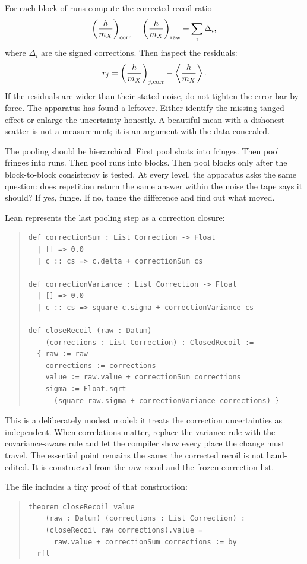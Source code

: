 For each block of runs compute the corrected recoil ratio
\[
  \left(\frac{h}{m_X}\right)_{\rm corr}
  =
  \left(\frac{h}{m_X}\right)_{\rm raw}
  + \sum_i \Delta_i,
\]
where \(\Delta_i\) are the signed corrections. Then inspect the residuals:
\[
  r_j =
  \left(\frac{h}{m_X}\right)_{j,{\rm corr}}
  -
  \left\langle\frac{h}{m_X}\right\rangle .
\]
If the residuals are wider than their stated noise, do not tighten the error bar by force. The apparatus has
found a leftover. Either identify the missing tanged effect or enlarge the uncertainty honestly. A beautiful mean
with a dishonest scatter is not a measurement; it is an argument with the data concealed.

The pooling should be hierarchical. First pool shots into fringes. Then pool fringes into runs. Then pool runs
into blocks. Then pool blocks only after the block-to-block consistency is tested. At every level, the apparatus
asks the same question: does repetition return the same answer within the noise the tape says it should? If yes,
funge. If no, tange the difference and find out what moved.

Lean represents the last pooling step as a correction closure:

\begin{quote}\small
\begin{verbatim}
def correctionSum : List Correction -> Float
  | [] => 0.0
  | c :: cs => c.delta + correctionSum cs

def correctionVariance : List Correction -> Float
  | [] => 0.0
  | c :: cs => square c.sigma + correctionVariance cs

def closeRecoil (raw : Datum)
    (corrections : List Correction) : ClosedRecoil :=
  { raw := raw
    corrections := corrections
    value := raw.value + correctionSum corrections
    sigma := Float.sqrt
      (square raw.sigma + correctionVariance corrections) }
\end{verbatim}
\end{quote}

This is a deliberately modest model: it treats the correction uncertainties as independent. When correlations
matter, replace the variance rule with the covariance-aware rule and let the compiler show every place the change
must travel. The essential point remains the same: the corrected recoil is not hand-edited. It is constructed
from the raw recoil and the frozen correction list.

The file includes a tiny proof of that construction:

\begin{quote}\small
\begin{verbatim}
theorem closeRecoil_value
    (raw : Datum) (corrections : List Correction) :
    (closeRecoil raw corrections).value =
      raw.value + correctionSum corrections := by
  rfl
\end{verbatim}
\end{quote}

